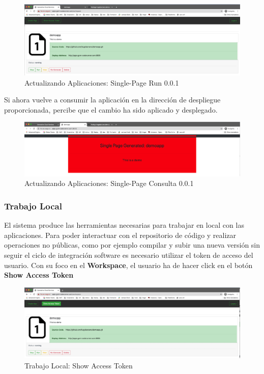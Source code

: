 \documentclass[a4paper,11pt]{book}
\begin{document}
 
   \begin{figure}[H]
\centering
\includegraphics[scale=0.25]{imagenes/casouso/2_11_a.png}
\caption{   Actualizando Aplicaciones: Single-Page Run 0.0.1  }
\end{figure}
 
 Si ahora vuelve a consumir la aplicación en la dirección de despliegue proporcionada, percibe que el cambio ha sido aplicado y desplegado. 
 
 
   \begin{figure}[H]
\centering
\includegraphics[scale=0.25]{imagenes/casouso/2_12_a.png}
\caption{  Actualizando Aplicaciones: Single-Page Consulta 0.0.1 }
\end{figure}

\subsubsection{Trabajo Local}

El sistema produce las herramientas necesarias para trabajar en local con las aplicaciones. Para poder interactuar con el repositorio de código y realizar operaciones no públicas, como por ejemplo compilar y subir una nueva versión sin seguir el ciclo de integración software es necesario utilizar el token de acceso del usuario. Con su foco en el \textbf{Workspace}, el usuario ha de hacer click en el botón \textbf{Show Access Token}

   \begin{figure}[H]
\centering
\includegraphics[scale=0.25]{imagenes/casouso/3_1_a.png}
\caption{  Trabajo Local:  Show Access Token}
\end{figure}
\end{document}
